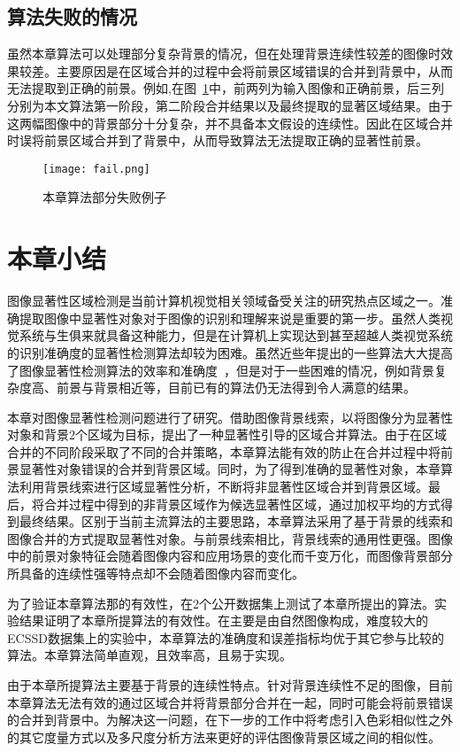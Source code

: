 \subsection{算法失败的情况}
\label{subsec:failure}

虽然本章算法可以处理部分复杂背景的情况，但在处理背景连续性较差的图像时效果较差。主要原因是在区域合并的过程中会将前景区域错误的合并到背景中，从而无法提取到正确的前景。例如,在图~\ref{fig:fail}中，前两列为输入图像和正确前景，后三列分别为本文算法第一阶段，第二阶段合并结果以及最终提取的显著区域结果。由于这两幅图像中的背景部分十分复杂，并不具备本文假设的连续性。因此在区域合并时误将前景区域合并到了背景中，从而导致算法无法提取正确的显著性前景。
 \begin{figure}[htb]
  \centering%
      {\texttt{[image: fail.png]}}

  \caption{本章算法部分失败例子}
  \label{fig:fail}
\end{figure}


\section{本章小结}
图像显著性区域检测是当前计算机视觉相关领域备受关注的研究热点区域之一。准确提取图像中显著性对象对于图像的识别和理解来说是重要的第一步。虽然人类视觉系统与生俱来就具备这种能力，但是在计算机上实现达到甚至超越人类视觉系统的识别准确度的显著性检测算法却较为困难。虽然近些年提出的一些算法大大提高了图像显著性检测算法的效率和准确度~\cite{ChengPAMI,ufo,Yan2014Hierarchical,geodesicDistance}，但是对于一些困难的情况，例如背景复杂度高、前景与背景相近等，目前已有的算法仍无法得到令人满意的结果。\par
本章对图像显著性检测问题进行了研究。借助图像背景线索，以将图像分为显著性对象和背景2个区域为目标，提出了一种显著性引导的区域合并算法。由于在区域合并的不同阶段采取了不同的合并策略，本章算法能有效的防止在合并过程中将前景显著性对象错误的合并到背景区域。同时，为了得到准确的显著性对象，本章算法利用背景线索进行区域显著性分析，不断将非显著性区域合并到背景区域。最后，将合并过程中得到的非背景区域作为候选显著性区域，通过加权平均的方式得到最终结果。区别于当前主流算法的主要思路，本章算法采用了基于背景的线索和图像合并的方式提取显著性对象。与前景线索相比，背景线索的通用性更强。图像中的前景对象特征会随着图像内容和应用场景的变化而千变万化，而图像背景部分所具备的连续性强等特点却不会随着图像内容而变化。\par
为了验证本章算法那的有效性，在2个公开数据集上测试了本章所提出的算法。实验结果证明了本章所提算法的有效性。在主要是由自然图像构成，难度较大的ECSSD数据集上的实验中，本章算法的准确度和误差指标均优于其它参与比较的算法。本章算法简单直观，且效率高，且易于实现。\par
由于本章所提算法主要基于背景的连续性特点。针对背景连续性不足的图像，目前本章算法无法有效的通过区域合并将背景部分合并在一起，同时可能会将前景错误的合并到背景中。为解决这一问题，在下一步的工作中将考虑引入色彩相似性之外的其它度量方式以及多尺度分析方法来更好的评估图像背景区域之间的相似性。
